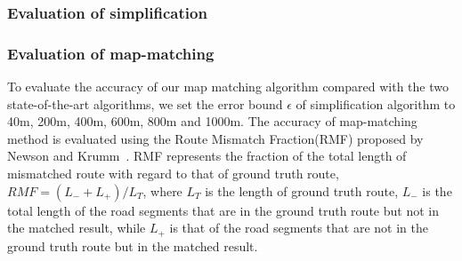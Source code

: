 




\subsubsection {Evaluation of simplification}




\subsubsection {Evaluation of map-matching}

To evaluate the accuracy of our map
matching algorithm compared with the two state-of-the-art algorithms, we set the error bound $\epsilon$
of simplification algorithm to 40m, 200m, 400m, 600m, 800m and 1000m.
The accuracy of map-matching method is evaluated using the
Route Mismatch Fraction(RMF) proposed by Newson and Krumm~\cite{Newson2009Hidden}.
RMF represents the fraction of the total length of mismatched
route with regard to that of ground truth route, {$RMF = (L_- + L_+) / L_T$}, where $L_T$ is the length of ground truth
route, $L_-$ is the total length of the road segments that are in the ground truth route but not in the matched result, while $L_+$ is that of the
road segments that are not in the ground truth route but in the matched result.



